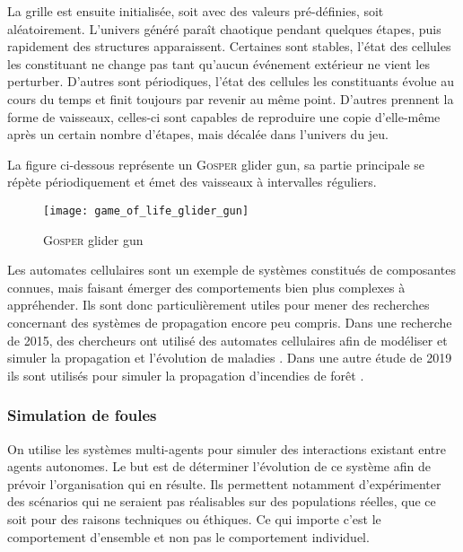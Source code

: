 La grille est ensuite initialisée, soit avec des valeurs pré-définies, soit aléatoirement.
L'univers généré paraît chaotique pendant quelques étapes, puis rapidement des structures apparaissent. Certaines sont stables, l'état des cellules les constituant ne change pas tant qu'aucun événement extérieur ne vient les perturber.
D'autres sont périodiques, l'état des cellules les constituants évolue au cours du temps et finit toujours par revenir au même point.
D'autres prennent la forme de vaisseaux, celles-ci sont capables de reproduire une copie d'elle-même après un certain nombre d'étapes, mais décalée dans l'univers du jeu.

La figure ci-dessous représente un \textsc{Gosper} glider gun, sa partie principale se répète périodiquement et émet des vaisseaux à intervalles réguliers.

\FloatBarrier
\begin{figure}[h!]
    \begin{minipage}[c]{0.55\textwidth}
        \begin{center}
            \texttt{[image: game\_of\_life\_glider\_gun]}
        \end{center}
    \end{minipage}\hfill
    \begin{minipage}[c]{0.45\textwidth}
        \caption{\textsc{Gosper} glider gun}
        \label{figure:gun}
    \end{minipage}
\end{figure}
\FloatBarrier

Les automates cellulaires sont un exemple de systèmes constitués de composantes connues, mais faisant émerger des comportements bien plus complexes à appréhender.
Ils sont donc particulièrement utiles pour mener des recherches concernant des systèmes de propagation encore peu compris.
Dans une recherche de 2015, des chercheurs ont utilisé des automates cellulaires afin de modéliser et simuler la propagation et l'évolution de maladies \cite{cellular_automata_diseases}.
Dans une autre étude de 2019 ils sont utilisés pour simuler la propagation d'incendies de forêt \cite{cellular_automata_fire}.

\subsubsection{Simulation de foules}

On utilise les systèmes multi-agents pour simuler des interactions existant entre agents autonomes.
Le but est de déterminer l'évolution de ce système afin de prévoir l'organisation qui en résulte.
Ils permettent notamment d'expérimenter des scénarios qui ne seraient pas réalisables sur des populations réelles, que ce soit pour des raisons techniques ou éthiques.
Ce qui importe c'est le comportement d'ensemble et non pas le comportement individuel.

